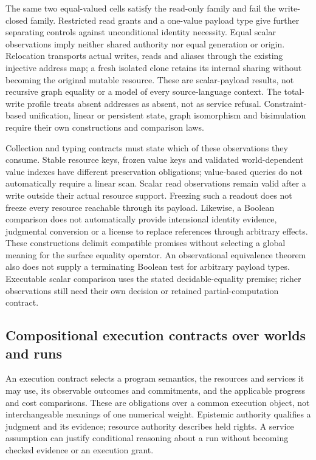 \documentclass[11pt]{article}
\theoremstyle{definition}
\theoremstyle{remark}
\begin{document}
The same two equal-valued cells satisfy the read-only family and fail the
write-closed family. Restricted read grants and a one-value payload type
give further separating controls against unconditional identity necessity.
Equal scalar observations imply neither shared authority nor equal
generation or origin. Relocation transports actual writes, reads and aliases
through the existing injective address map; a fresh isolated clone retains
its internal sharing without becoming the original mutable resource.
These are scalar-payload results, not recursive graph equality or a model
of every source-language context. The total-write profile treats absent
addresses as absent, not as service refusal. Constraint-based unification,
linear or persistent state, graph isomorphism and bisimulation require their
own constructions and comparison laws.

Collection and typing contracts must state which of these observations they
consume. Stable resource keys, frozen value keys and validated
world-dependent value indexes have different preservation obligations;
value-based queries do not automatically require a linear scan. Scalar
read observations remain valid after a write outside their actual resource
support. Freezing such a readout does not freeze every resource reachable
through its payload. Likewise, a Boolean comparison does not automatically
provide intensional identity evidence, judgmental conversion or a license
to replace references through arbitrary effects. These constructions
delimit compatible promises without selecting a global meaning for the
surface equality operator.
An observational equivalence theorem also does not supply a terminating
Boolean test for arbitrary payload types. Executable scalar comparison uses
the stated decidable-equality premise; richer observations still need their
own decision or retained partial-computation contract.

\subsection{Compositional execution contracts over worlds and runs}
\label{sec:execution-contracts}

An execution contract selects a program semantics, the resources and services
it may use, its observable outcomes and commitments, and the applicable
progress and cost comparisons. These are obligations over a common execution
object, not interchangeable meanings of one numerical weight. Epistemic
authority qualifies a judgment and its evidence; resource authority describes
held rights. A service assumption can justify conditional reasoning about a
run without becoming checked evidence or an execution grant.
\end{document}
